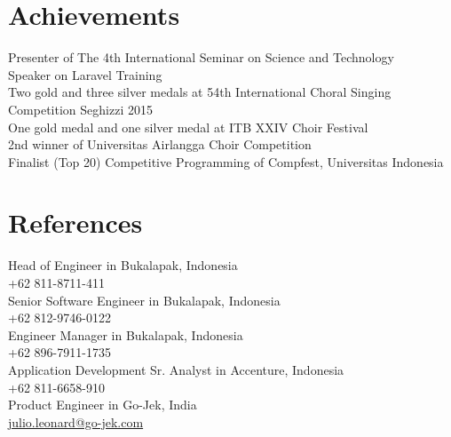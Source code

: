\documentclass[letterpaper]{deedy-resume} %
\begin{document}
\newpage %
\begin{minipage}[t]{0.39\textwidth}


\section{Achievements}
  Presenter of The 4th International Seminar on Science and Technology \\
  Speaker on Laravel Training \\
  Two gold and three silver medals at 54th International Choral Singing Competition Seghizzi 2015 \\
  One gold medal and one silver medal at ITB XXIV Choir Festival \\
  2nd winner of Universitas Airlangga Choir Competition \\
  Finalist (Top 20) Competitive Programming of Compfest, Universitas Indonesia \\
\sectionspace


\section{References}
Head of Engineer in Bukalapak, Indonesia\\
+62 811-8711-411\\
Senior Software Engineer in Bukalapak, Indonesia\\
+62 812-9746-0122\\
Engineer Manager in Bukalapak, Indonesia\\
+62 896-7911-1735\\
Application Development Sr. Analyst in Accenture, Indonesia\\
+62 811-6658-910\\
  Product Engineer in Go-Jek, India\\
  \href{mailto:julio.leonard@go-jek.com}{julio.leonard@go-jek.com}\\

\end{minipage} %
\end{document}
